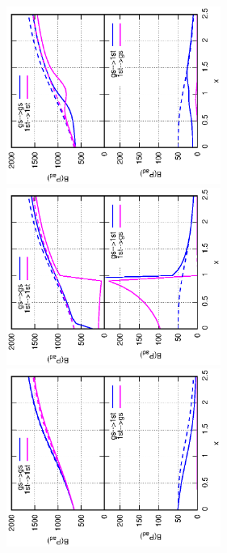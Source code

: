 \documentclass[%
superscriptaddress,
preprint,
showpacs,
nofootinbib,
amsmath,amssymb,
aps,
prc,
floatfix ]%
{revtex4-1}
\begin{document}
\begin{figure}[t]
 \begin{minipage}{0.3\hsize}
 \begin{center}
  \includegraphics[width=70mm,angle=-90]{images/N50Pad_CQ.eps}
 \end{center}
 \captionsetup{labelformat=empty,labelsep=none}
 \end{minipage}
 \begin{minipage}{0.3\hsize}
 \begin{center}
  \includegraphics[width=70mm,angle=-90]{images/N50Pad_FD.eps}
 \end{center}
 \captionsetup{labelformat=empty,labelsep=none}
 \end{minipage}
 \begin{minipage}{0.3\hsize}
 \begin{center}
  \includegraphics[width=70mm,angle=-90]{images/N50Pad_SPA.eps}

\end{center}
\end{minipage}
\end{figure}
\end{document}
